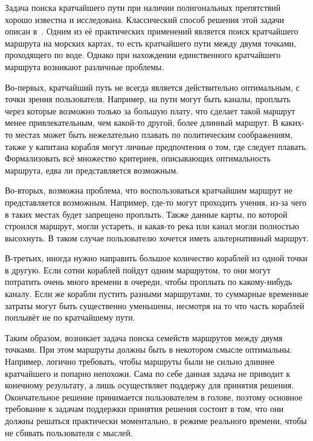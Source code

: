 \startprefacepage

Задача поиска кратчайшего пути при наличии полигональных препятствий
хорошо известна и исследована. Классический способ решения этой задачи
описан в~\cite{de2000computational}. Одним из её практических применений является
поиск кратчайшего маршрута на морских картах, то есть кратчайшего пути
между двумя точками, проходящего по воде. Однако при нахождении
единственного кратчайшего маршрута возникают различные проблемы.

Во-первых, кратчайший путь не всегда является действительно
оптимальным, с точки зрения пользователя. Например, на пути могут быть
каналы, проплыть через которые возможно только за большую плату, что
сделает такой маршрут менее привлекательным, чем какой-то другой,
более длинный маршрут. В каких-то местах может быть нежелательно
плавать по политическим соображениям, также у капитана корабля могут
личные предпочтения о том, где следует плавать. Формализовать всё
множество критериев, описывающих оптимальность маршрута, едва ли
представляется возможным.

Во-вторых, возможна проблема, что воспользоваться кратчайшим маршрут
не представляется возможным. Например, где-то могут проходить учения,
из-за чего в таких местах будет запрещено проплыть. Также данные
карты, по которой строился маршрут, могли устареть, и какая-то река
или канал могли полностью высохнуть. В таком случае пользователю
хочется иметь альтернативный маршрут.

В-третьих, иногда нужно направить большое количество кораблей из одной
точки в другую. Если сотни кораблей пойдут одним маршрутом, то они
могут потратить очень много времени в очереди, чтобы проплыть по
какому-нибудь каналу. Если же корабли пустить разными маршрутами, то
суммарные временные затраты могут быть существенно уменьшены, несмотря
на то что часть кораблей поплывёт не по кратчайшему пути.

Таким образом, возникает задача поиска семейств маршрутов между двумя
точками. При этом маршруты должны быть в некотором смысле оптимальны.
Например, логично требовать, чтобы маршруты были не сильно длиннее
кратчайшего и попарно непохожи. Сама по себе данная задача не приводит
к конечному результату, а лишь осуществляет поддержу для принятия
решения. Окончательное решение принимается пользователем в голове,
поэтому основное требование к задачам поддержки принятия решения
состоит в том, что они должны решаться практически моментально, в
режиме реального времени, чтобы не сбивать пользователя с мыслей.

